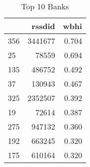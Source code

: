 \begin{table}
\centering
\caption{Top 10 Banks}
\label{tab:top10}
\begin{tabular}{lrr}
\toprule
{} &   rssdid &  wbhi \\
\midrule
356 &  3441677 & 0.704 \\
25  &    78559 & 0.694 \\
135 &   486752 & 0.492 \\
37  &   130943 & 0.467 \\
325 &  2352507 & 0.392 \\
19  &    72614 & 0.387 \\
275 &   947132 & 0.360 \\
192 &   663245 & 0.320 \\
175 &   610164 & 0.320 \\
\bottomrule
\end{tabular}
\end{table}
